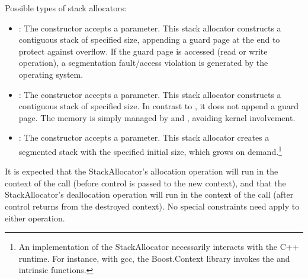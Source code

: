 Possible types of stack allocators:
\begin{itemize}
    \item {}: The constructor accepts a 
        parameter. This stack allocator constructs a contiguous stack of
        specified size, appending a guard page at the end to protect against
        overflow. If the guard page is accessed (read or write operation), a
        segmentation fault/access violation is generated by the operating
        system.
    \item {}: The constructor accepts a  parameter.
        This stack allocator constructs a contiguous stack of specified size.
        In contrast to , it does not append a guard
        page. The memory is simply managed by 
        and , avoiding kernel involvement.
    \item {}: The constructor accepts a  parameter.
        This stack allocator creates a segmented stack with the specified
        initial size, which grows on demand.\footnote{An implementation of
        the  StackAllocator necessarily interacts with the C++
        runtime. For instance, with gcc, the Boost.Context\cite{bcontext} library
        invokes the 
        and  intrinsic
        functions.\cite{splitalloc}\citecomma\cite{bctxseg}}
\end{itemize}

It is expected that the StackAllocator's allocation operation will run in the
context of the \callcc call (before control is passed to the new context), and
that the StackAllocator's deallocation operation will run in the context of
the \dtor call (after control returns from the destroyed
context). No special constraints need apply to either operation.
